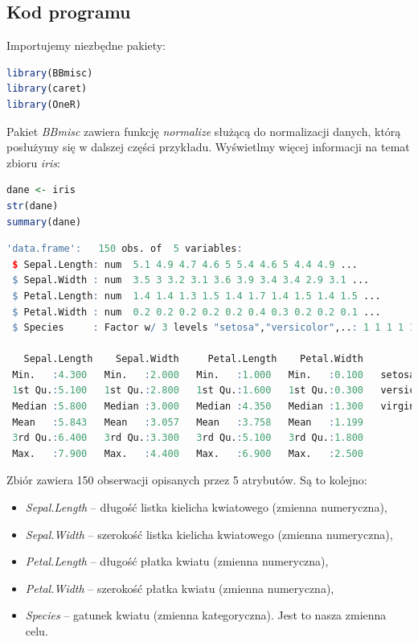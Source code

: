 \documentclass[a4paper]{article}
\begin{document}
\subsection{Kod programu}
Importujemy niezbędne pakiety:
\begin{lstlisting}[language=R, frame =single]
library(BBmisc)
library(caret)
library(OneR)
\end{lstlisting}
Pakiet \textit{BBmisc} zawiera funkcję \textit{normalize} służącą do normalizacji danych, którą posłużymy się w dalszej części przykładu. Wyświetlmy więcej informacji na temat zbioru \textit{iris}:
\begin{lstlisting}[language=R, frame=single]
dane <- iris
str(dane)
summary(dane)
\end{lstlisting}
\begin{lstlisting}[language=R, frame=single]
'data.frame':	150 obs. of  5 variables:
 $ Sepal.Length: num  5.1 4.9 4.7 4.6 5 5.4 4.6 5 4.4 4.9 ...
 $ Sepal.Width : num  3.5 3 3.2 3.1 3.6 3.9 3.4 3.4 2.9 3.1 ...
 $ Petal.Length: num  1.4 1.4 1.3 1.5 1.4 1.7 1.4 1.5 1.4 1.5 ...
 $ Petal.Width : num  0.2 0.2 0.2 0.2 0.2 0.4 0.3 0.2 0.2 0.1 ...
 $ Species     : Factor w/ 3 levels "setosa","versicolor",..: 1 1 1 1 1 1 1 1 1 1 ...
 
   Sepal.Length    Sepal.Width     Petal.Length    Petal.Width          Species  
 Min.   :4.300   Min.   :2.000   Min.   :1.000   Min.   :0.100   setosa    :50  
 1st Qu.:5.100   1st Qu.:2.800   1st Qu.:1.600   1st Qu.:0.300   versicolor:50  
 Median :5.800   Median :3.000   Median :4.350   Median :1.300   virginica :50  
 Mean   :5.843   Mean   :3.057   Mean   :3.758   Mean   :1.199                  
 3rd Qu.:6.400   3rd Qu.:3.300   3rd Qu.:5.100   3rd Qu.:1.800                  
 Max.   :7.900   Max.   :4.400   Max.   :6.900   Max.   :2.500 
\end{lstlisting}
Zbiór zawiera 150 obserwacji opisanych przez 5 atrybutów. Są to kolejno:
\begin{itemize}
    \item \textit{Sepal.Length} – długość listka kielicha kwiatowego (zmienna numeryczna),
    \item \textit{Sepal.Width} – szerokość listka kielicha kwiatowego (zmienna numeryczna),
    \item \textit{Petal.Length } – długość płatka kwiatu (zmienna numeryczna),
    \item \textit{Petal.Width } – szerokość płatka kwiatu (zmienna numeryczna),
    \item \textit{Species} -- gatunek kwiatu (zmienna kategoryczna). Jest to nasza zmienna celu.
\end{itemize}
\end{document}
